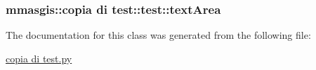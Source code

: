 \label{classmmasgis_1_1copia_01di_01test_1_1test_a1abd356913d754ea34a1473d8bf3f2dd}
\hypertarget{classmmasgis_1_1copia_01di_01test_1_1test_a791e0d36150ef988e043fd89195a588f}{
\subsubsection[{textArea}]{\setlength{\rightskip}{0pt plus 5cm}mmasgis::copia di test::test::textArea}}
\label{classmmasgis_1_1copia_01di_01test_1_1test_a791e0d36150ef988e043fd89195a588f}


The documentation for this class was generated from the following file:\begin{DoxyCompactItemize}
\item 
\hyperlink{copia_01di_01test_8py}{copia di test.py}\end{DoxyCompactItemize}
